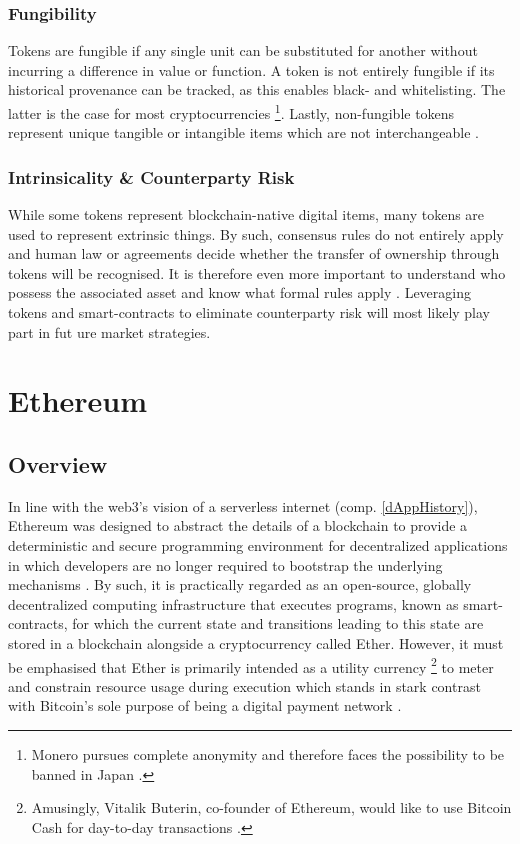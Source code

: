 \subsubsection{Fungibility}
Tokens are fungible if any single unit can be substituted for another without incurring a difference in value or function. A token is not entirely fungible if its historical provenance can be tracked, as this enables black- and whitelisting. The latter is the case for most cryptocurrencies \footnote{Monero pursues complete anonymity and therefore faces the possibility to be banned in Japan \cite{monero}.}. Lastly, non-fungible tokens represent unique tangible or intangible items which are not interchangeable \cite[p.~175]{Antonopoulos.2018}.

\subsubsection{Intrinsicality \& Counterparty Risk}
While some tokens represent blockchain-native digital items, many tokens are used to represent extrinsic things. By such, consensus rules do not entirely apply and human law or agreements decide whether the transfer of ownership through tokens will be recognised. It is therefore even more important to understand who possess the associated asset and know what formal rules apply \cite[pp.~175-176]{Antonopoulos.2018}. Leveraging tokens and smart-contracts to eliminate counterparty risk will most likely play part in fut
ure market strategies.

\pagebreak

\section{Ethereum}
\subsection{Overview}
In line with the web3's vision of a serverless internet (comp. \ref{dAppHistory}), Ethereum was designed to abstract the details of a blockchain to provide a deterministic and secure programming environment for decentralized applications in which developers  are no longer required to bootstrap the underlying mechanisms \cite[p.~27]{Antonopoulos.2018}. By such, it is practically regarded as an open-source, globally decentralized computing infrastructure that executes programs, known as smart-contracts, for which the current state and transitions leading to this state are stored in a blockchain alongside a cryptocurrency called Ether. However, it must be emphasised that Ether is primarily intended as a utility currency \footnote{Amusingly, Vitalik Buterin, co-founder of Ethereum, would like to use Bitcoin Cash for day-to-day transactions \cite{forbes2018}.} to meter and constrain resource usage during execution which stands in stark contrast with Bitcoin's sole purpose of being a digital payment network \cite[p.~23]{Antonopoulos.2018} \cite[p.~1]{bitcoin}.

